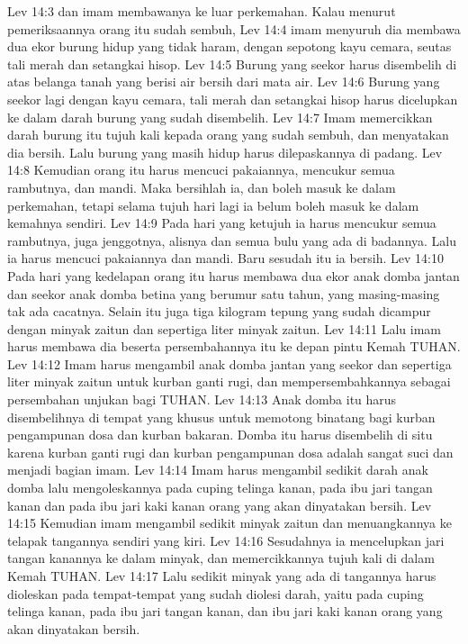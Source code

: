 Lev 14:3  dan imam membawanya ke luar perkemahan. Kalau menurut pemeriksaannya orang itu sudah sembuh,
Lev 14:4  imam menyuruh dia membawa dua ekor burung hidup yang tidak haram, dengan sepotong kayu cemara, seutas tali merah dan setangkai hisop.
Lev 14:5  Burung yang seekor harus disembelih di atas belanga tanah yang berisi air bersih dari mata air.
Lev 14:6  Burung yang seekor lagi dengan kayu cemara, tali merah dan setangkai hisop harus dicelupkan ke dalam darah burung yang sudah disembelih.
Lev 14:7  Imam memercikkan darah burung itu tujuh kali kepada orang yang sudah sembuh, dan menyatakan dia bersih. Lalu burung yang masih hidup harus dilepaskannya di padang.
Lev 14:8  Kemudian orang itu harus mencuci pakaiannya, mencukur semua rambutnya, dan mandi. Maka bersihlah ia, dan boleh masuk ke dalam perkemahan, tetapi selama tujuh hari lagi ia belum boleh masuk ke dalam kemahnya sendiri.
Lev 14:9  Pada hari yang ketujuh ia harus mencukur semua rambutnya, juga jenggotnya, alisnya dan semua bulu yang ada di badannya. Lalu ia harus mencuci pakaiannya dan mandi. Baru sesudah itu ia bersih.
Lev 14:10  Pada hari yang kedelapan orang itu harus membawa dua ekor anak domba jantan dan seekor anak domba betina yang berumur satu tahun, yang masing-masing tak ada cacatnya. Selain itu juga tiga kilogram tepung yang sudah dicampur dengan minyak zaitun dan sepertiga liter minyak zaitun.
Lev 14:11  Lalu imam harus membawa dia beserta persembahannya itu ke depan pintu Kemah TUHAN.
Lev 14:12  Imam harus mengambil anak domba jantan yang seekor dan sepertiga liter minyak zaitun untuk kurban ganti rugi, dan mempersembahkannya sebagai persembahan unjukan bagi TUHAN.
Lev 14:13  Anak domba itu harus disembelihnya di tempat yang khusus untuk memotong binatang bagi kurban pengampunan dosa dan kurban bakaran. Domba itu harus disembelih di situ karena kurban ganti rugi dan kurban pengampunan dosa adalah sangat suci dan menjadi bagian imam.
Lev 14:14  Imam harus mengambil sedikit darah anak domba lalu mengoleskannya pada cuping telinga kanan, pada ibu jari tangan kanan dan pada ibu jari kaki kanan orang yang akan dinyatakan bersih.
Lev 14:15  Kemudian imam mengambil sedikit minyak zaitun dan menuangkannya ke telapak tangannya sendiri yang kiri.
Lev 14:16  Sesudahnya ia mencelupkan jari tangan kanannya ke dalam minyak, dan memercikkannya tujuh kali di dalam Kemah TUHAN.
Lev 14:17  Lalu sedikit minyak yang ada di tangannya harus dioleskan pada tempat-tempat yang sudah diolesi darah, yaitu pada cuping telinga kanan, pada ibu jari tangan kanan, dan ibu jari kaki kanan orang yang akan dinyatakan bersih.
